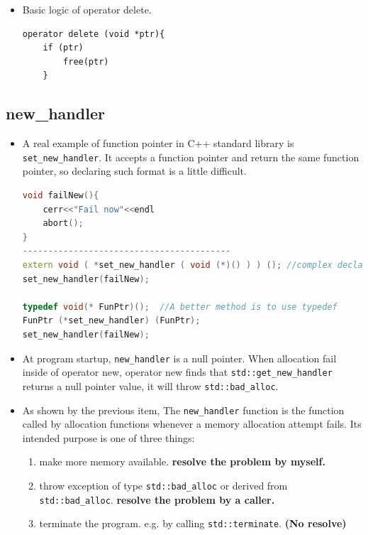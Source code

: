 \documentclass[a4paper,11pt,twoside]{book}
\begin{document}
\begin{itemize}
\item Basic logic of operator delete.
\begin{lstlisting}[numbers=none]
operator delete (void *ptr){
	if (ptr)
		free(ptr)
	}
\end{lstlisting}

\end{itemize}

\subsection{new\_handler}
\begin{itemize}	
	
	\item A real example of function pointer in C++ standard library is \texttt{set\_new\_handler}. It accepts a function pointer and return the same function pointer, so declaring such format is a little difficult.
\begin{lstlisting}[frame=single, language=c++]
void failNew(){
	cerr<<"Fail now"<<endl
	abort();
}
-----------------------------------------
extern void ( *set_new_handler ( void (*)() ) ) (); //complex declaration.	
set_new_handler(failNew);

typedef void(* FunPtr)();  //A better method is to use typedef
FunPtr (*set_new_handler) (FunPtr);
set_new_handler(failNew);
\end{lstlisting}
		
	
	\item At program startup, \texttt{new\_handler} is a null pointer. When allocation fail inside of operator new, operator new finds that \texttt{std::get\_new\_handler} returns a null pointer value, it will throw \texttt{std::bad\_alloc}.
	
	\item  As shown by the previous item, The \texttt{new\_handler} function is the function called by allocation functions whenever a memory allocation attempt fails. Its intended purpose is one of three things:
	
	\begin{enumerate}
		\item make more memory available. \textbf{resolve the problem by myself.}
		
		\item throw exception of type \texttt{std::bad\_alloc} or derived from \texttt{std::bad\_alloc}. \textbf{resolve the problem by a caller.}
		
		\item terminate the program. e.g. by calling \texttt{std::terminate}. \textbf{(No resolve)}
	\end{enumerate}
	

\end{itemize}
\end{document}
